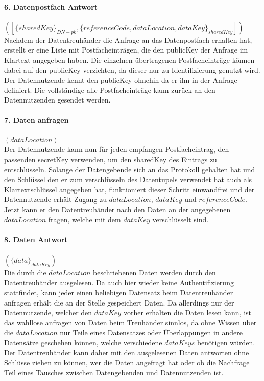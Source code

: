 \documentclass[11pt,a4paper]{scrreprt}
\begin{document}
\paragraph{6. Datenpostfach Antwort} $([\{sharedKey\}_{DN-pk}, \{referenceCode, dataLocation, dataKey\}_{sharedKey}])$\\
Nachdem der Datentreuhänder die Anfrage an das Datenpostfach erhalten hat, erstellt er eine Liste mit Postfacheinträgen, die den publicKey der Anfrage im Klartext angegeben haben. Die einzelnen übertragenen Postfacheinträge können dabei auf den publicKey verzichten, da dieser nur zu Identifizierung genutzt wird. Der Datennutzende kennt den publicKey ohnehin da er ihn in der Anfrage definiert. Die vollständige alle Postfacheinträge kann zurück an den Datennutzenden gesendet werden.

\paragraph{7. Daten anfragen} $(dataLocation)$\\
Der Datennutzende kann nun für jeden empfangen Postfacheintrag, den passenden secretKey verwenden, um den sharedKey des Eintrags zu entschlüsseln. Solange der Datengebende sich an das Protokoll gehalten hat und den Schlüssel den er zum verschlüsseln des Datentupels verwendet hat auch als Klartextschlüssel angegeben hat, funktioniert dieser Schritt einwandfrei und der Datennutzende erhält Zugang zu $dataLocation$, $dataKey$ und $referenceCode$. Jetzt kann er den Datentreuhänder nach den Daten an der angegebenen $dataLocation$ fragen, welche mit dem $dataKey$ verschlüsselt sind.

\paragraph{8. Daten Antwort} $(\{data\}_{dataKey})$\\
Die durch die $dataLocation$ beschriebenen Daten werden durch den Datentreuhänder ausgelesen. Da auch hier wieder keine Authentifizierung stattfindet, kann jeder einen beliebigen Datensatz beim Datentreuhänder anfragen erhält die an der Stelle gespeichert Daten. Da allerdings nur der Datennutzende, welcher den $dataKey$ vorher erhalten die Daten lesen kann, ist das wahllose anfragen von Daten beim Treuhänder sinnlos, da ohne Wissen über die $dataLocation$ nur Teile eines Datensatzes oder Überlappungen in andere Datensätze geschehen können, welche verschiedene $dataKeys$ benötigen würden. Der Datentreuhänder kann daher mit den ausgelesenen Daten antworten ohne Schlüsse ziehen zu können, wer die Daten angefragt hat oder ob die Nachfrage Teil eines Tausches zwischen Datengebenden und Datennutzenden ist.
\end{document}
